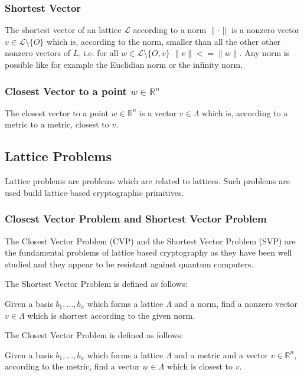\documentclass[a4paper,titlepage]{article}
\newcommand\norm[1]{\lVert#1\rVert}
\begin{document}
\subsubsection{Shortest Vector}
The shortest vector of an lattice $\mathcal{L}$ according to a norm $\norm{\cdot}$ is a nonzero vector $v \in \mathcal{L} \setminus \{O\}$ which is, according to the norm, smaller than all the other other nonzero vectors of $L$, i.e. for all $w \in \mathcal{L} \setminus \{O, v\}$ $\norm{v} <= \norm{w}$. Any norm is possible like for example the Euclidian norm or the infinity norm.


\subsubsection{Closest Vector to a point $w \in \mathds{R}^n$}
The closest vector to a point $w \in \mathds{R}^n$ is a vector $v \in Λ$ which is, according to a metric to a metric, closest to $v$.


\subsection{Lattice Problems}
Lattice problems are problems which are related to lattices. Such problems are used build lattice-based cryptographic primitives.

\subsubsection{Closest Vector Problem and Shortest Vector Problem}
The Closest Vector Problem (CVP) and the Shortest Vector Problem (SVP) are the fundamental problems of lattice based cryptography as they have been well studied and they appear to be resistant against quantum computers.

The Shortest Vector Problem is defined as follows:

Given a basis $b_1, \ldots, b_n$ which forms a lattice $\Lambda$ and a norm, find a nonzero vector $v \in \Lambda$ which is shortest according to the given norm.

The Closest Vector Problem is defined as follows:

Given a basis $b_1, \ldots, b_n$ which forms a lattice $\Lambda$ and a metric and a vector $v \in \mathds{R}^n$, according to the metric, find a vector $w \in \Lambda$ which is closest to $v$.
\end{document}
